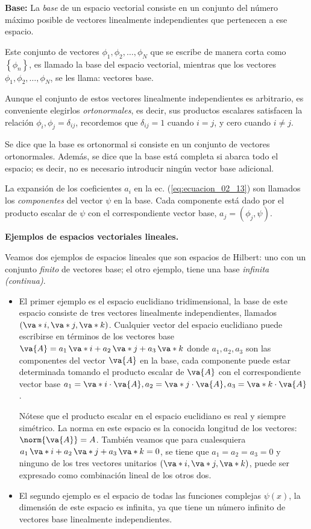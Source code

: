 \textbf{Base: } La \emph{base} de un espacio vectorial consiste en un conjunto del número máximo posible de vectores linealmente independientes que pertenecen a ese espacio.
\par
Este conjunto de vectores $\phi_{1}, \phi_{2}, \ldots, \phi_{N}$ que se escribe de manera corta como $\left\{ \phi_{n} \right\}$, es llamado la base del espacio vectorial, mientras que los vectores $\phi_{1}, \phi_{2}, \ldots, \phi_{N}$, se les llama: vectores base.
\par
Aunque el conjunto de estos vectores linealmente independientes es arbitrario, es conveniente elegirlos \emph{ortonormales}, es decir, sus productos escalares satisfacen la relación $\phi_{i}, \phi_{j} = \delta_{ij}$, recordemos que $\delta_{ij} = 1$ cuando $i = j$, y cero cuando $i \neq j$.
\par
Se dice que la base es ortonormal si consiste en un conjunto de vectores ortonormales. Además, se dice que la base está completa si abarca todo el espacio; es decir, no es necesario introducir ningún vector base adicional.
\par
La expansión de los coeficientes $a_{i}$ en la ec. (\ref{eq:ecuacion_02_13}) son llamados los \emph{componentes} del vector $\psi$ en la base. Cada componente está dado por el producto escalar de $\psi$ con el correspondiente vector base, $a_{j} = (\phi_{j}, \psi)$.
\par
\textbf{Ejemplos de espacios vectoriales lineales.}

Veamos dos ejemplos de espacios lineales que son espacios de Hilbert: uno con un conjunto \emph{finito} de vectores base; el otro ejemplo, tiene una base \emph{infinita (continua)}.
\begin{itemize}
\item El primer ejemplo es el espacio euclidiano tridimensional, la base de este espacio consiste de tres vectores linealmente independientes, llamados $(\va*{i}, \va*{j}, \va*{k})$. Cualquier vector del espacio euclidiano puede escribirse en términos de los vectores base $\va{A} = a_{1} \, \va*{i} + a_{2} \, \va*{j} + a_{3} \, \va*{k}$ donde $a_{1}, a_{2}, a_{3}$ son las componentes del vector $\va{A}$ en la base, cada componente puede estar determinada tomando el producto escalar de $\va{A}$ con el correspondiente vector base $a_{1} = \va*{i} \cdot \va{A}, a_{2} = \va*{j} \cdot \va{A}, a_{3} = \va*{k} \cdot \va{A}$.
\par
Nótese que el producto escalar en el espacio euclidiano es real y siempre simétrico. La norma en este espacio es la conocida longitud de los vectores: $\norm{\va{A}} = A$. También veamos que para cualesquiera $a_{1} \, \va*{i} + a_{2} \, \va*{j} + a_{3} \, \va*{k} = 0$, se tiene que $a_{1} = a_{2} = a_{3} = 0$ y ninguno de los tres vectores unitarios $(\va*{i}, \va*{j}, \va*{k})$, puede ser expresado como combinación lineal de los otros dos.
\item El segundo ejemplo es el espacio de todas las funciones complejas $\psi (x)$, la dimensión de este espacio es infinita, ya que tiene un número infinito de vectores base linealmente independientes.
\end{itemize}

